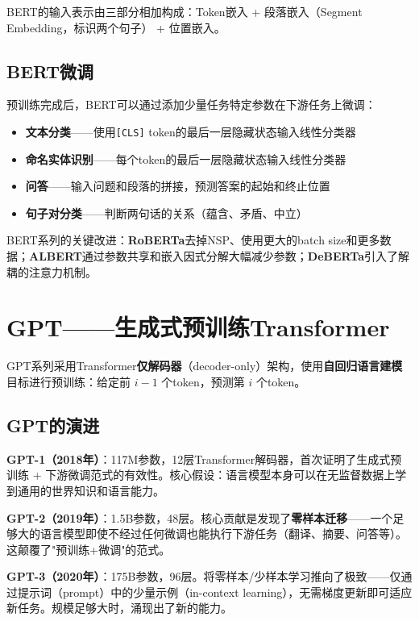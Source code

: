 BERT的输入表示由三部分相加构成：Token嵌入 + 段落嵌入（Segment Embedding，标识两个句子） + 位置嵌入。

\subsection{BERT微调}

预训练完成后，BERT可以通过添加少量任务特定参数在下游任务上微调：
\begin{itemize}
    \item \textbf{文本分类}——使用\texttt{[CLS]} token的最后一层隐藏状态输入线性分类器
    \item \textbf{命名实体识别}——每个token的最后一层隐藏状态输入线性分类器
    \item \textbf{问答}——输入问题和段落的拼接，预测答案的起始和终止位置
    \item \textbf{句子对分类}——判断两句话的关系（蕴含、矛盾、中立）
\end{itemize}

BERT系列的关键改进：\textbf{RoBERTa}去掉NSP、使用更大的batch size和更多数据；\textbf{ALBERT}通过参数共享和嵌入因式分解大幅减少参数；\textbf{DeBERTa}引入了解耦的注意力机制。

\section{GPT——生成式预训练Transformer}

GPT系列采用Transformer\textbf{仅解码器}（decoder-only）架构，使用\textbf{自回归语言建模}目标进行预训练：给定前 $i-1$ 个token，预测第 $i$ 个token。

\subsection{GPT的演进}

\textbf{GPT-1（2018年）}：117M参数，12层Transformer解码器，首次证明了生成式预训练 + 下游微调范式的有效性。核心假设：语言模型本身可以在无监督数据上学到通用的世界知识和语言能力。

\textbf{GPT-2（2019年）}：1.5B参数，48层。核心贡献是发现了\textbf{零样本迁移}——一个足够大的语言模型即使不经过任何微调也能执行下游任务（翻译、摘要、问答等）。这颠覆了"预训练+微调"的范式。

\textbf{GPT-3（2020年）}：175B参数，96层。将零样本/少样本学习推向了极致——仅通过提示词（prompt）中的少量示例（in-context learning），无需梯度更新即可适应新任务。规模足够大时，涌现出了新的能力。

